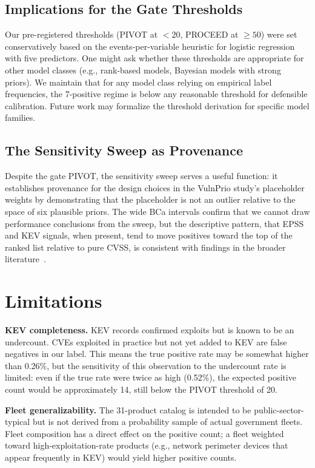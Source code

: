 \documentclass[conference]{IEEEtran}
\begin{document}
\subsection{Implications for the Gate Thresholds}

Our pre-registered thresholds (PIVOT at $<20$, PROCEED at $\geq 50$) were
set conservatively based on the events-per-variable heuristic for logistic
regression with five predictors. One might ask whether these thresholds
are appropriate for other model classes (e.g., rank-based models, Bayesian
models with strong priors). We maintain that for any model class relying
on empirical label frequencies, the 7-positive regime is below any
reasonable threshold for defensible calibration. Future work may
formalize the threshold derivation for specific model families.

\subsection{The Sensitivity Sweep as Provenance}

Despite the gate PIVOT, the sensitivity sweep serves a useful function: it
establishes provenance for the design choices in the VulnPrio study's placeholder
weights by demonstrating that the placeholder is not an outlier relative
to the space of six plausible priors. The wide BCa intervals confirm that
we cannot draw performance conclusions from the sweep, but the descriptive
pattern, that EPSS and KEV signals, when present, tend to move positives
toward the top of the ranked list relative to pure CVSS, is consistent
with findings in the broader literature~\cite{jacobs2021epss}.

\section{Limitations}
\label{sec:limitations}

\textbf{KEV completeness.} KEV records confirmed exploits but is known
to be an undercount. CVEs exploited in practice but not yet added to KEV
are false negatives in our label. This means the true positive rate may
be somewhat higher than 0.26\%, but the sensitivity of this observation to
the undercount rate is limited: even if the true rate were twice as high
(0.52\%), the expected positive count would be approximately 14, still
below the PIVOT threshold of 20.

\textbf{Fleet generalizability.} The 31-product catalog is intended to
be public-sector-typical but is not derived from a probability sample of
actual government fleets. Fleet composition has a direct effect on the
positive count; a fleet weighted toward high-exploitation-rate products
(e.g., network perimeter devices that appear frequently in KEV) would
yield higher positive counts.
\end{document}
